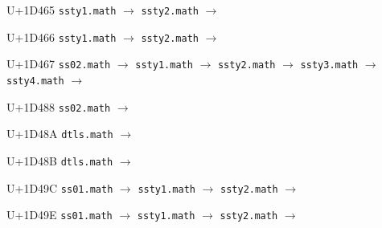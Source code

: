 \documentclass{article}
\begin{document}
\begin{substitutions}
\goodbreak

U+1D465  \linebreak
    \texttt{ssty1.math} $\to$  \linebreak
    \texttt{ssty2.math} $\to$  

\goodbreak

U+1D466  \linebreak
    \texttt{ssty1.math} $\to$  \linebreak
    \texttt{ssty2.math} $\to$  

\goodbreak

U+1D467  \linebreak
    \texttt{ss02.math} $\to$  \linebreak
    \texttt{ssty1.math} $\to$  \linebreak
    \texttt{ssty2.math} $\to$  \linebreak
    \texttt{ssty3.math} $\to$  \linebreak
    \texttt{ssty4.math} $\to$  

\goodbreak

U+1D488  \linebreak
    \texttt{ss02.math} $\to$  

\goodbreak

U+1D48A  \linebreak
    \texttt{dtls.math} $\to$  

\goodbreak

U+1D48B  \linebreak
    \texttt{dtls.math} $\to$  

\goodbreak

U+1D49C  \linebreak
    \texttt{ss01.math} $\to$  \linebreak
    \texttt{ssty1.math} $\to$  \linebreak
    \texttt{ssty2.math} $\to$  

\goodbreak

U+1D49E  \linebreak
    \texttt{ss01.math} $\to$  \linebreak
    \texttt{ssty1.math} $\to$  \linebreak
    \texttt{ssty2.math} $\to$  


\end{substitutions}
\end{document}
